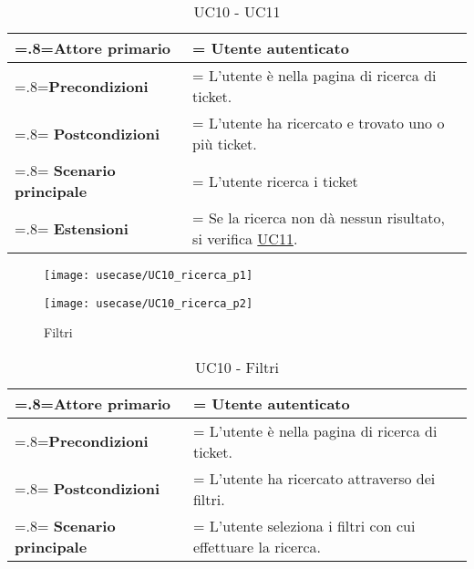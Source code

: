 \begin{table}[H]
                \centering
                \renewcommand{\arraystretch}{1.8}
                \renewcommand\tabularxcolumn[1]{m{#1}}
                \begin{tabularx}{0.9\textwidth} {
                    >{\hsize=.8\hsize\linewidth=\hsize}X
                    >{\hsize=1.2\hsize\linewidth=\hsize}X}
                    \hline
                    \textbf{Attore primario} & Utente autenticato \\
                    \hline
                    \textbf{Precondizioni} & L'utente è nella pagina di ricerca di ticket. \\
                    \hline
                    \textbf{Postcondizioni} & L'utente ha ricercato e trovato uno o più ticket. \\
                    \hline
                    \textbf{Scenario principale} & L'utente ricerca i ticket \\
                    \hline
                    \textbf{Estensioni} & Se la ricerca non dà nessun risultato, si verifica \hyperref[UC11]{UC11}. \\
                    \hline
                \end{tabularx}
                \caption{UC10 - UC11}
            \end{table}
            
\begin{figure}[H]
    \centering 
    \texttt{[image: usecase/UC10\_ricerca\_p1]}
    
\end{figure}     
\begin{figure}[H]
    \centering 
    \texttt{[image: usecase/UC10\_ricerca\_p2]}
    \caption{Filtri}
\end{figure}  
\begin{table}[H]
                \centering
                \renewcommand{\arraystretch}{1.8}
                \renewcommand\tabularxcolumn[1]{m{#1}}
                \begin{tabularx}{0.9\textwidth} {
                    >{\hsize=.8\hsize\linewidth=\hsize}X
                    >{\hsize=1.2\hsize\linewidth=\hsize}X}
                    \hline
                    \textbf{Attore primario} & Utente autenticato \\
                    \hline
                    \textbf{Precondizioni} & L'utente è nella pagina di ricerca di ticket. \\
                    \hline
                    \textbf{Postcondizioni} & L'utente ha ricercato attraverso dei filtri. \\
                    \hline
                    \textbf{Scenario principale} & L'utente seleziona i filtri con cui effettuare la ricerca. \\
                    \hline
                    
                \end{tabularx}
                \caption{UC10 - Filtri}
            \end{table}
            

